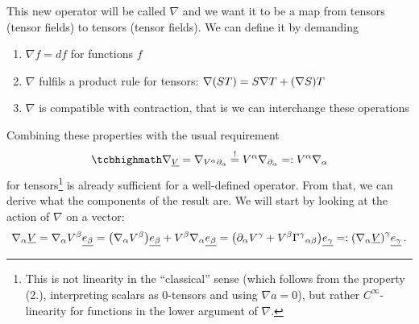 \documentclass[../relativity_main.tex]{subfiles}
\begin{document}
This new operator will be called  $\nabla$ and we want it to be a map from tensors (tensor fields) to tensors (tensor fields). We can define it by demanding
\begin{enumerate}[(1.)]
\item $\nabla f = df$ for functions $f$


\item $\nabla$ fulfils a product rule for tensors: $\nabla \qty(S T) = S \nabla T + \qty(\nabla S) T$


\item $\nabla$ is compatible with contraction, that is we can interchange these operations
\end{enumerate}
Combining these properties with the usual requirement
\begin{equation}
\eqbox{
\nabla_{\fvec{V}} = \nabla_{V^\alpha \partial_\alpha} \overset{!}{=} V^\alpha \nabla_{\partial_\alpha} =: V^\alpha \nabla_\alpha
}
\end{equation}
for tensors\footnote{This is not linearity in the \enquote{classical} sense (which follows from the property (2.), interpreting scalars as $0$-tensors and using $\nabla a = 0$), but rather $C^\infty$-linearity for functions in the lower argument of $\nabla$.} is already sufficient for a well-defined operator. From that, we can derive what the components of the result are. We will start by looking at the action of $\nabla$ on a vector:
\begin{equation}
\nabla_\alpha \underline{V} = \nabla_\alpha V^\beta \underline{e_\beta} = \qty(\nabla_\alpha V^\beta) \underline{e_\beta} + V^\beta \nabla_\alpha \underline{e_\beta} = \qty(\partial_\alpha V^\gamma + V^\beta \Gamma^\gamma{}_{\alpha \beta}) \underline{e_\gamma} =: \qty(\nabla_\alpha \underline{V})^\gamma \underline{e_\gamma} \, .
\end{equation}
\end{document}
